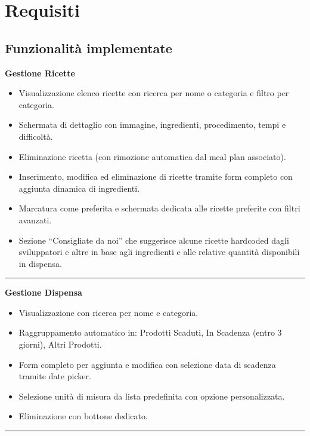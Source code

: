 \documentclass[a4paper, 12pt]{article}
\begin{document}
\newpage
\section{Requisiti}
\subsection{Funzionalità implementate}

{\color{ForestGreen}\raggedright{\large \textbf{Gestione Ricette}}}
\begin{itemize}
    \item Visualizzazione elenco ricette con ricerca per nome o categoria e filtro per categoria.
    \item Schermata di dettaglio con immagine, ingredienti, procedimento, tempi e difficoltà.
    \item Eliminazione ricetta (con rimozione automatica dal meal plan associato).
    \item Inserimento, modifica ed eliminazione di ricette tramite form completo con aggiunta dinamica di ingredienti.
    \item Marcatura come preferita e schermata dedicata alle ricette preferite con filtri avanzati.
    \item Sezione “Consigliate da noi” che suggerisce alcune ricette hardcoded dagli sviluppatori e altre in base agli ingredienti e alle relative quantità disponibili in dispensa.
\end{itemize}

\vspace{0.5 cm}
\hrule
\vspace{0.5 cm}

{\color{ForestGreen}\raggedright{\large \textbf{Gestione Dispensa}}}
\begin{itemize}
    \item Visualizzazione con ricerca per nome e categoria.
    \item Raggruppamento automatico in: Prodotti Scaduti, In Scadenza (entro 3 giorni), Altri Prodotti.
    \item Form completo per aggiunta e modifica con selezione data di scadenza tramite date picker.
    \item Selezione unità di misura da lista predefinita con opzione personalizzata.
    \item Eliminazione con bottone dedicato.
\end{itemize}

\vspace{0.5 cm}
\hrule
\vspace{0.5 cm}
\end{document}

